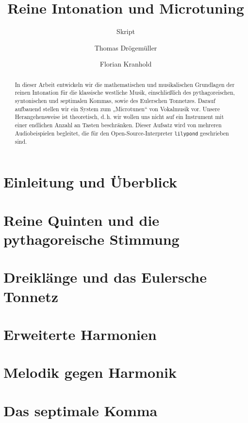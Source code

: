 \documentclass[ngerman,11pt]{scrartcl}
\title     {Reine Intonation und Microtuning}
\author    {Thomas Drögemüller\and Florian Kranhold}
\subtitle  {Skript}
\begin{document}
\maketitle

\begin{abstract}
  In dieser Arbeit entwickeln wir die mathematischen und musikalischen
  Grundlagen der reinen Intonation für die klassische westliche Musik,
  einschließlich des pythagoreischen, syntonischen und septimalen Kommas, sowie
  des Eulerschen Tonnetzes. Darauf aufbauend stellen wir ein System zum
  „Microtunen“ von Vokalmusik vor. Unsere Herangehensweise ist theoretisch,
  d.\,h. wir wollen uns nicht auf ein Instrument mit einer endlichen Anzahl an
  Tasten beschränken. Dieser Aufsatz wird von mehreren Audiobeispielen
  begleitet, die für den Open-Source-Interpreter \texttt{lilypond} geschrieben
  sind.
\end{abstract}

\section{Einleitung und Überblick}
\label{sec:int}


\section{Reine Quinten und die pythagoreische Stimmung}
\label{sec:pyth}


\section{Dreiklänge und das Eulersche Tonnetz}
\label{sec:tri}


\section{Erweiterte Harmonien}
\label{sec:quad}


\section{Melodik gegen Harmonik}
\label{sec:melody}


\section{Das septimale Komma}
\label{sec:sept}


\printbibliography[heading=bibintoc]
\end{document}
